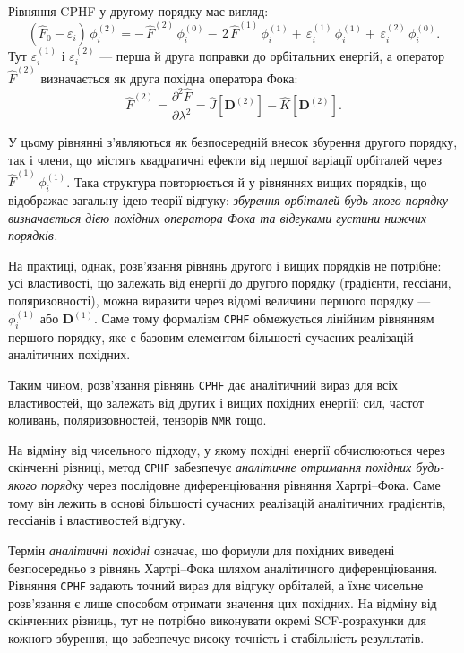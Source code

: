 \begin{commentbox}
Рівняння CPHF у другому порядку має вигляд:
\[
(\hat F_0 - \varepsilon_i)\,\phi_i^{(2)} =
 -\,\hat F^{(2)}\,\phi_i^{(0)}
 -\,2\,\hat F^{(1)}\,\phi_i^{(1)}
 +\,\varepsilon_i^{(1)}\,\phi_i^{(1)}
 +\,\varepsilon_i^{(2)}\,\phi_i^{(0)}.
\]
Тут \(\varepsilon_i^{(1)}\) і \(\varepsilon_i^{(2)}\) --- перша й друга поправки до орбітальних енергій,
а оператор \(\hat F^{(2)}\) визначається як друга похідна оператора Фока:
\[
\hat F^{(2)} = \frac{\partial^2 \hat F}{\partial \lambda^2}
= \hat J[\mathbf D^{(2)}] - \hat K[\mathbf D^{(2)}].
\]

У цьому рівнянні з’являються як безпосередній внесок збурення другого порядку, так і члени, що містять квадратичні ефекти від першої варіації орбіталей через~$\hat F^{(1)}\,\phi_i^{(1)}$.
Така структура повторюється й у рівняннях вищих порядків, що відображає загальну ідею теорії відгуку:
\emph{збурення орбіталей будь-якого порядку визначається дією похідних оператора Фока та відгуками густини нижчих порядків.}

На практиці, однак, розв’язання рівнянь другого і вищих порядків не потрібне:
усі властивості, що залежать від енергії до другого порядку (градієнти, гессіани, поляризовності),
можна виразити через відомі величини першого порядку --- $\phi_i^{(1)}$ або \(\mathbf D^{(1)}\).
Саме тому формалізм \texttt{CPHF} обмежується лінійним рівнянням першого порядку, яке є базовим елементом більшості сучасних реалізацій аналітичних похідних.
\end{commentbox}


Таким чином, розв’язання рівнянь \texttt{CPHF} дає аналітичний вираз для
всіх властивостей, що залежать від других і вищих похідних енергії:
сил, частот коливань, поляризовностей, тензорів \texttt{NMR} тощо.


На відміну від чисельного підходу, у якому похідні енергії
обчислюються через скінченні різниці,
метод \texttt{CPHF} забезпечує \emph{аналітичне отримання похідних будь-якого порядку}
через послідовне диференціювання рівняння Хартрі–Фока.
Саме тому він лежить в основі більшості сучасних реалізацій
аналітичних градієнтів, гессіанів і властивостей відгуку.

\begin{commentbox}
Термін \emph{аналітичні похідні} означає, що формули для похідних
виведені безпосередньо з рівнянь Хартрі–Фока шляхом аналітичного диференціювання.
Рівняння \texttt{CPHF} задають точний вираз для відгуку орбіталей,
а їхнє чисельне розв’язання є лише способом отримати значення цих похідних.
На відміну від скінченних різниць, тут не потрібно виконувати окремі SCF-розрахунки
для кожного збурення, що забезпечує високу точність і стабільність результатів.
\end{commentbox}

